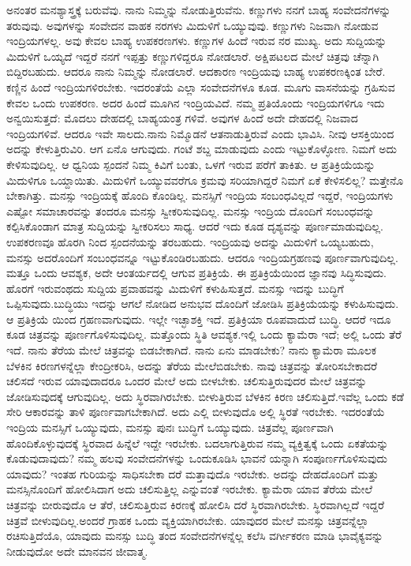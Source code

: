 ಅನಂತರ ಮನಶ್ಯಾಸ್ತ್ರಕ್ಕೆ ಬರುವೆವು. ನಾನು ನಿಮ್ಮನ್ನು ನೋಡುತ್ತಿರುವೆನು. ಕಣ್ಣುಗಳು ನನಗೆ ಬಾಹ್ಯ ಸಂವೇದನೆಗಳನ್ನು ತರುವುವು. ಅವುಗಳನ್ನು ಸಂವೇದನ ವಾಹಕ ನರಗಳು ಮಿದುಳಿಗೆ ಒಯ್ಯುವುವು. ಕಣ್ಣುಗಳು ನಿಜವಾಗಿ ನೋಡುವ ಇಂದ್ರಿಯಗಳಲ್ಲ. ಅವು ಕೇವಲ ಬಾಹ್ಯ ಉಪಕರಣಗಳು. ಕಣ್ಣುಗಳ ಹಿಂದೆ ಇರುವ ನರ ಮುಖ್ಯ. ಅದು ಸುದ್ದಿಯನ್ನು ಮಿದುಳಿಗೆ ಒಯ್ಯದೆ ಇದ್ದರೆ ನನಗೆ ಇಪ್ಪತ್ತು ಕಣ್ಣುಗಳಿದ್ದರೂ ನೋಡಲಾರೆ. ಅಕ್ಷಿಪಟಲದ ಮೇಲೆ ಚಿತ್ರವು ಚೆನ್ನಾಗಿ ಬಿದ್ದಿರಬಹುದು. ಆದರೂ ನಾನು ನಿಮ್ಮನ್ನು ನೋಡಲಾರೆ. ಆದಕಾರಣ ಇಂದ್ರಿಯವು ಬಾಹ್ಯ ಉಪಕರಣಕ್ಕಿಂತ ಬೇರೆ. ಕಣ್ಣಿನ ಹಿಂದೆ ಇಂದ್ರಿಯಗಳಿರಬೇಕು. ಇದರಂತೆಯೆ ಎಲ್ಲಾ ಸಂವೇದನೆಗಳೂ ಕೂಡ. ಮೂಗು ವಾಸನೆಯನ್ನು ಗ್ರಹಿಸುವ ಕೇವಲ ಒಂದು ಉಪಕರಣ. ಅದರ ಹಿಂದೆ ಮೂಗಿನ ಇಂದ್ರಿಯವಿದೆ. ನಮ್ಮ ಪ್ರತಿಯೊಂದು ಇಂದ್ರಿಯಗಳಿಗೂ ಇದು ಅನ್ವಯಿಸುತ್ತದೆ: ಮೊದಲು ದೇಹದಲ್ಲಿ ಬಾಹ್ಯಯಂತ್ರ ಗಳಿವೆ. ಅವುಗಳ ಹಿಂದೆ ಅದೇ ದೇಹದಲ್ಲಿ ನಿಜವಾದ ಇಂದ್ರಿಯಗಳಿವೆ. ಆದರೂ ಇವೇ ಸಾಲದು.ನಾನು ನಿಮ್ಮೊಡನೆ ಆತನಾಡುತ್ತಿರುವೆ ಎಂದು ಭಾವಿಸಿ. ನೀವು ಆಸಕ್ತಿಯಿಂದ ಅದನ್ನು ಕೇಳುತ್ತಿರುವಿರಿ. ಆಗ ಏನೊ ಆಗುವುದು. ಗಂಟೆ ಶಬ್ದ ಮಾಡುವುದು ಎಂದು ಇಟ್ಟುಕೊಳ್ಳೋಣ. ನಿಮಗೆ ಅದು ಕೇಳಿಸುವುದಿಲ್ಲ. ಆ ಧ್ವನಿಯ ಸ್ಪಂದನೆ ನಿಮ್ಮ ಕಿವಿಗೆ ಬಂತು, ಒಳಗೆ ಇರುವ ಪರೆಗೆ ತಾಕಿತು. ಆ ಪ್ರತಿಕ್ರಿಯೆಯನ್ನು ಮಿದುಳಿಗೂ ಒಯ್ದಾಯಿತು. ಮಿದುಳಿಗೆ ಒಯ್ಯುವವರೆಗೂ ಕ್ರಮವು ಸರಿಯಾಗಿದ್ದರೆ ನಿಮಗೆ ಏಕೆ ಕೇಳಿಸಲಿಲ್ಲ? ಮತ್ತೇನೊ ಬೇಕಾಗಿತ್ತು. ಮನಸ್ಸು ಇಂದ್ರಿಯಕ್ಕೆ ಹೊಂದಿ ಕೊಂಡಿಲ್ಲ. ಮನಸ್ಸಿಗೆ ಇಂದ್ರಿಯ ಸಂಬಂಧವಿಲ್ಲದೆ ಇದ್ದರೆ, ಇಂದ್ರಿಯಗಳು ಎಷ್ಟೋ ಸಮಾಚಾರವನ್ನು ತಂದರೂ ಮನಸ್ಸು ಸ್ವೀಕರಿಸುವುದಿಲ್ಲ. ಮನಸ್ಸು ಇಂದ್ರಿಯ ದೊಂದಿಗೆ ಸಂಬಂಧವನ್ನು ಕಲ್ಪಿಸಿಕೊಂಡಾಗ ಮಾತ್ರ ಸುದ್ದಿಯನ್ನು ಸ್ವೀಕರಿಸಲು ಸಾಧ್ಯ. ಆದರೆ ಇದು ಕೂಡ ದೃಶ್ಯವನ್ನು ಪೂರ್ಣಮಾಡುವುದಿಲ್ಲ. ಉಪಕರಣವೂ ಹೊರಗಿ ನಿಂದ ಸ್ಪಂದನೆಯನ್ನು ತರಬಹುದು. ಇಂದ್ರಿಯವು ಅದನ್ನು ಮಿದುಳಿಗೆ ಒಯ್ಯಬಹುದು, ಮನಸ್ಸು ಅದರೊಂದಿಗೆ ಸಂಬಂಧವನ್ನೂ ಇಟ್ಟುಕೊಂಡಿರಬಹುದು. ಆದರೂ ಇಂದ್ರಿಯಗ್ರಹಣವು ಪೂರ್ಣವಾಗುವುದಿಲ್ಲ. ಮತ್ತೂ ಒಂದು ಆವಶ್ಯಕ, ಅದೇ ಆಂತರ್ಯದಲ್ಲಿ ಆಗುವ ಪ್ರತಿಕ್ರಿಯೆ. ಈ ಪ್ರತಿಕ್ರಿಯೆಯಿಂದ ಜ್ಞಾನವು ಸಿದ್ಧಿಸುವುದು. ಹೊರಗೆ ಇರುವಂಥದು ಸುದ್ದಿಯ ಪ್ರವಾಹವನ್ನು ಮಿದುಳಿಗೆ ಕಳುಹಿಸುತ್ತದೆ. ಮನಸ್ಸು ಇದನ್ನು ಬುದ್ಧಿಗೆ ಒಪ್ಪಿಸುವುದು.ಬುದ್ಧಿಯು ಇದನ್ನು ಆಗಲೆ ನೋಡಿದ ಅನುಭವ ದೊಂದಿಗೆ ಜೋಡಿಸಿ ಪ್ರತಿಕ್ರಿಯೆಯನ್ನು ಕಳುಹಿಸುವುದು. ಆ ಪ್ರತಿಕ್ರಿಯೆ ಯಿಂದ ಗ್ರಹಣವಾಗುವುದು. ಇಲ್ಲೇ ಇಚ್ಛಾಶಕ್ತಿ ಇದೆ. ಪ್ರತಿಕ್ರಿಯಾ ರೂಪವಾದುದೆ ಬುದ್ಧಿ. ಆದರೆ ಇದೂ ಕೂಡ ಚಿತ್ರವನ್ನು ಪೂರ್ಣಗೊಳಿಸುವುದಿಲ್ಲ. ಮತ್ತೊಂದು ಸ್ಥಿತಿ ಆವಶ್ಯಕ.ಇಲ್ಲಿ ಒಂದು ಕ್ಯಾಮೆರಾ ಇದೆ; ಅಲ್ಲಿ ಒಂದು ತೆರೆ ಇದೆ. ನಾನು ತೆರೆಯ ಮೇಲೆ ಚಿತ್ರವನ್ನು ಬಿಡಬೇಕಾಗಿದೆ. ನಾನು ಏನು ಮಾಡಬೇಕು? ನಾನು ಕ್ಯಾಮೆರಾ ಮೂಲಕ ಬೆಳಕಿನ ಕಿರಣಗಳನ್ನೆಲ್ಲಾ ಕೇಂದ್ರೀಕರಿಸಿ, ಅದನ್ನು ತೆರೆಯ ಮೇಲೆಬಿಡಬೇಕು. ನಾವು ಚಿತ್ರವನ್ನು ತೋರಿಸಬೇಕಾದರೆ ಚಲಿಸದೆ ಇರುವ ಯಾವುದಾದರೂ ಒಂದರ ಮೇಲೆ ಅದು ಬೀಳಬೇಕು. ಚಲಿಸುತ್ತಿರುವುದರ ಮೇಲೆ ಚಿತ್ರವನ್ನು ಜೋಡಿಸುವುದಕ್ಕೆ ಆಗುವುದಿಲ್ಲ. ಅದು ಸ್ಥಿರವಾಗಿರಬೇಕು. ಬೀಳುತ್ತಿರುವ ಬೆಳಕಿನ ಕಿರಣ ಚಲಿಸುತ್ತಿದೆ.ಇವೆಲ್ಲ ಒಂದು ಕಡೆ ಸೇರಿ ಆಕಾರವನ್ನು ತಾಳಿ ಪೂರ್ಣವಾಗಬೇಕಾಗಿದೆ. ಅದು ಎಲ್ಲಿ ಬೀಳುವುದೊ ಅಲ್ಲಿ ಸ್ಥಿರತೆ ಇರಬೇಕು. ಇದರಂತೆಯೆ ಇಂದ್ರಿಯ ಮನಸ್ಸಿಗೆ ಒಯ್ಯುವುದು, ಮನಸ್ಸು ಪುನಃ ಬುದ್ಧಿಗೆ ಒಯ್ಯುವುದು. ಚಿತ್ರವೆಲ್ಲ ಪೂರ್ಣವಾಗಿ ಹೊಂದಿಕೊಳ್ಳುವುದಕ್ಕೆ ಸ್ಥಿರವಾದ ಹಿನ್ನೆಲೆ ಇದ್ದೇ ಇರಬೇಕು. ಬದಲಾಗುತ್ತಿರುವ ನಮ್ಮ ವ್ಯಕ್ತಿತ್ವಕ್ಕೆ ಒಂದು ಏಕತೆಯನ್ನು ಕೊಡುವುದಾವುದು? ನಮ್ಮ ಹಲವು ಸಂವೇದನೆಗಳನ್ನು ಒಂದುಕೂಡಿಸಿ ಭಾವನೆ ಯನ್ನಾಗಿ ಸಂಪೂರ್ಣಗೊಳಿಸುವುದು ಯಾವುದು? ಇಂತಹ ಗುರಿಯನ್ನು ಸಾಧಿಸಬೇಕಾ ದರೆ ಮತ್ತಾವುದೊ ಇರಬೇಕು. ಅದನ್ನು ದೇಹದೊಂದಿಗೆ ಮತ್ತು ಮನಸ್ಸಿನೊಂದಿಗೆ ಹೋಲಿಸಿದಾಗ ಅದು ಚಲಿಸುತ್ತಿಲ್ಲ ಎನ್ನುವಂತೆ ಇರಬೇಕು. ಕ್ಯಾಮೆರಾ ಯಾವ ತೆರೆಯ ಮೇಲೆ ಚಿತ್ರವನ್ನು ಬೀರುವುದೊ ಆ ತೆರೆ, ಚಲಿಸುತ್ತಿರುವ ಕಿರಣಕ್ಕೆ ಹೋಲಿಸಿ ದರೆ ಸ್ಥಿರವಾಗಿರಬೇಕು. ಸ್ಥಿರವಾಗಿಲ್ಲದೆ ಇದ್ದರೆ ಚಿತ್ರವೆ ಬೀಳುವುದಿಲ್ಲ.ಅಂದರೆ ಗ್ರಾಹಕ ಒಂದು ವ್ಯಕ್ತಿಯಾಗಿರಬೇಕು. ಯಾವುದರ ಮೇಲೆ ಮನಸ್ಸು ಚಿತ್ರವನ್ನೆಲ್ಲಾ ರಚಿಸುತ್ತಿದೆಯೊ, ಯಾವುದು ಮನಸ್ಸು ಬುದ್ಧಿ ತಂದ ಸಂವೇದನೆಗಳನ್ನೆಲ್ಲ ಕಲೆಸಿ ವರ್ಗೀಕರಣ ಮಾಡಿ ಭಾವೈಕ್ಯವನ್ನು ನೀಡುವುದೋ ಅದೇ ಮಾನವನ ಜೀವಾತ್ಮ.

